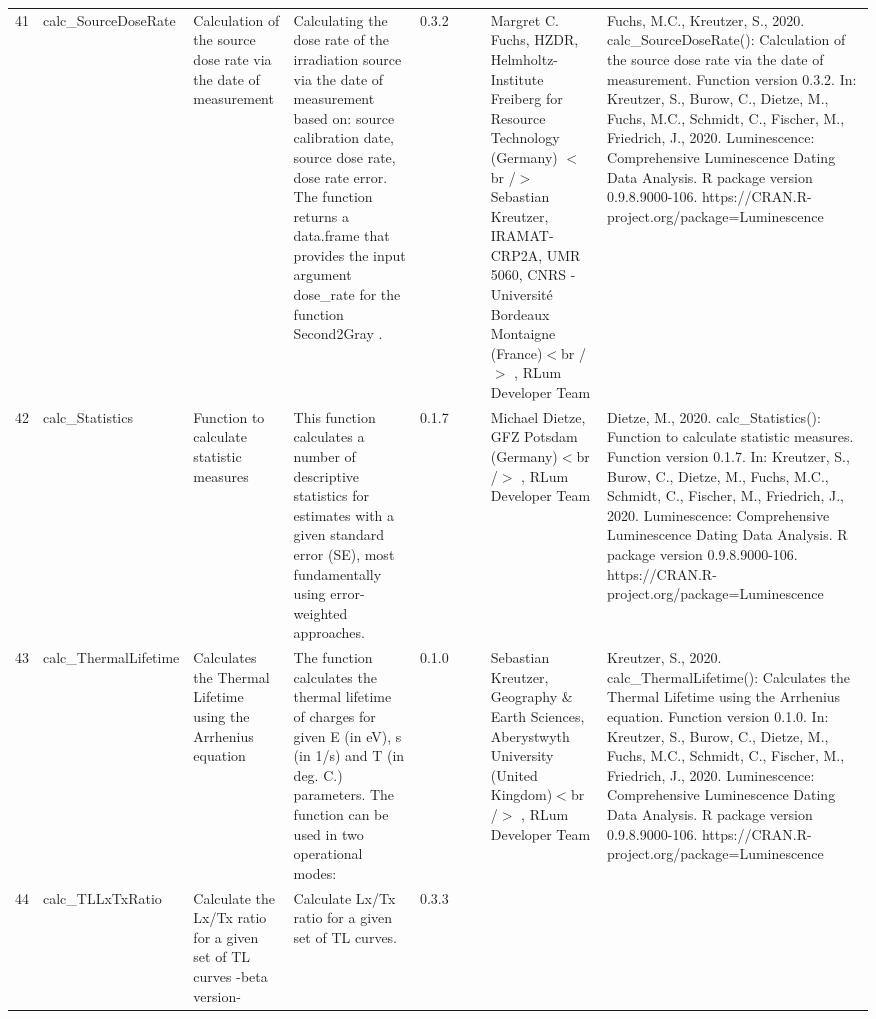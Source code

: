 \begin{table}[ht]
\begin{tabular}{rllllllll}
  41 & calc\_SourceDoseRate & Calculation of the source dose rate via the date of measurement & Calculating the dose rate of the irradiation source via the date of measurement based on: source calibration date, source dose rate, dose rate error. The function returns a data.frame that provides the input argument dose\_rate for the function  Second2Gray . & 0.3.2
 &  &  & Margret C. Fuchs, HZDR, Helmholtz-Institute Freiberg for Resource Technology (Germany)  $<$br /$>$ Sebastian Kreutzer, IRAMAT-CRP2A, UMR 5060, CNRS - Université Bordeaux Montaigne (France)$<$br /$>$ , RLum Developer Team & Fuchs, M.C., Kreutzer, S., 2020. calc\_SourceDoseRate(): Calculation of the source dose rate via the date of measurement. Function version 0.3.2. In: Kreutzer, S., Burow, C., Dietze, M., Fuchs, M.C., Schmidt, C., Fischer, M., Friedrich, J., 2020. Luminescence: Comprehensive Luminescence Dating Data Analysis. R package version 0.9.8.9000-106. https://CRAN.R-project.org/package=Luminescence
 \\ 
  42 & calc\_Statistics & Function to calculate statistic measures & This function calculates a number of descriptive statistics for estimates with a given standard error (SE), most fundamentally using error-weighted approaches. & 0.1.7
 &  &  & Michael Dietze, GFZ Potsdam (Germany)$<$br /$>$ , RLum Developer Team & Dietze, M., 2020. calc\_Statistics(): Function to calculate statistic measures. Function version 0.1.7. In: Kreutzer, S., Burow, C., Dietze, M., Fuchs, M.C., Schmidt, C., Fischer, M., Friedrich, J., 2020. Luminescence: Comprehensive Luminescence Dating Data Analysis. R package version 0.9.8.9000-106. https://CRAN.R-project.org/package=Luminescence
 \\ 
  43 & calc\_ThermalLifetime & Calculates the Thermal Lifetime using the Arrhenius equation & The function calculates the thermal lifetime of charges for given E (in eV), s (in 1/s) and T (in deg. C.) parameters. The function can be used in two operational modes: & 0.1.0
 &  &  & Sebastian Kreutzer, Geography \& Earth Sciences, Aberystwyth University (United Kingdom)$<$br /$>$ , RLum Developer Team & Kreutzer, S., 2020. calc\_ThermalLifetime(): Calculates the Thermal Lifetime using the Arrhenius equation. Function version 0.1.0. In: Kreutzer, S., Burow, C., Dietze, M., Fuchs, M.C., Schmidt, C., Fischer, M., Friedrich, J., 2020. Luminescence: Comprehensive Luminescence Dating Data Analysis. R package version 0.9.8.9000-106. https://CRAN.R-project.org/package=Luminescence
 \\ 
  44 & calc\_TLLxTxRatio & Calculate the Lx/Tx ratio for a given set of TL curves -beta version- & Calculate Lx/Tx ratio for a given set of TL curves. & 0.3.3

\end{tabular}
\end{table}
